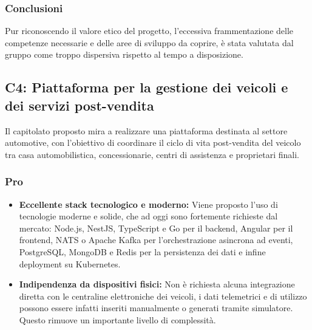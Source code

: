 \subsubsection{Conclusioni}
Pur riconoscendo il valore etico del progetto, l'eccessiva frammentazione delle competenze necessarie e delle aree di sviluppo da coprire, è stata valutata dal gruppo come troppo dispersiva rispetto al tempo a disposizione.

\subsection{C4: Piattaforma per la gestione dei veicoli e dei servizi post-vendita}

Il capitolato proposto mira a realizzare una piattaforma destinata al settore automotive, con l'obiettivo di coordinare il ciclo di vita post-vendita del veicolo tra casa automobilistica, concessionarie, centri di assistenza e proprietari finali.

\subsubsection{Pro}
\begin{itemize}
    \item \textbf{Eccellente stack tecnologico e moderno:} Viene proposto l'uso di tecnologie moderne e solide, che ad oggi sono fortemente richieste dal mercato: Node.js, NestJS, TypeScript e Go per il backend, Angular per il frontend, NATS o Apache Kafka per l'orchestrazione asincrona ad eventi, PostgreSQL, MongoDB e Redis per la persistenza dei dati e infine deployment su Kubernetes.
    \item \textbf{Indipendenza da dispositivi fisici:} Non è richiesta alcuna integrazione diretta con le centraline elettroniche dei veicoli, i dati telemetrici e di utilizzo possono essere infatti inseriti manualmente o generati tramite simulatore. Questo rimuove un importante livello di complessità.
\end{itemize}

